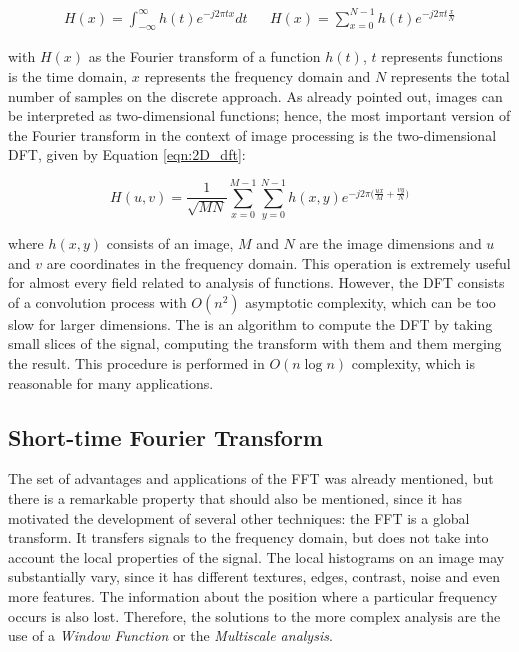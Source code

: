 \begin{align}
\label{eqn:fourier_transform}
    H(x) = \int_{-\infty}^{\infty}h(t)e^{-j2 \pi tx}dt
    &&
    H(x) = \sum_{x=0}^{N-1}h(t)e^{-j2 \pi t \frac{x}{N}}
\end{align}

\noindent with $H(x)$ as the Fourier transform of a function $h(t)$, $t$ represents functions is the time domain, $x$ represents the frequency domain and $N$ represents the total number of samples on the discrete approach. As already pointed out, images can be interpreted as two-dimensional functions; hence, the most important version of the Fourier transform in the context of image processing is the two-dimensional DFT, given by Equation \ref{eqn:2D_dft}:

\begin{equation}
\label{eqn:2D_dft}
    H(u,v) = \frac{1}{\sqrt{MN}}\sum_{x=0}^{M-1}\sum_{y=0}^{N-1}h(x,y)e^{-j2 \pi \big(\frac{ux}{M} + \frac{vy}{N}\big)}
\end{equation}

\noindent where $h(x,y)$ consists of an image, $M$ and $N$ are the image dimensions and $u$ and $v$ are coordinates in the frequency domain. This operation is extremely useful for almost every field related to analysis of functions. However, the DFT consists of a convolution process with $O(n^{2})$ asymptotic complexity, which can be too slow for larger dimensions. The  is an algorithm to compute the DFT by taking small slices of the signal, computing the transform with them and them merging the result. This procedure is performed in $O(n \log n)$ complexity, which is reasonable for many applications.

\subsection{Short-time Fourier Transform}

The set of advantages and applications of the FFT was already mentioned, but there is a remarkable property that should also be mentioned, since it has motivated the development of several other techniques: the FFT is a global transform. It transfers signals to the frequency domain, but does not take into account the local properties of the signal. The local histograms on an image may substantially vary, since it has different textures, edges, contrast, noise and even more features. The information about the position where a particular frequency occurs is also lost. Therefore, the solutions to the more complex analysis are the use of a \emph{Window Function} or the \emph{Multiscale analysis}.


